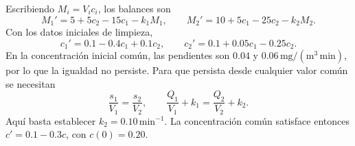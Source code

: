 Escribiendo \(M_i=V_ic_i\), los balances son
\[
M_1'=5+5c_2-15c_1-k_1M_1,\qquad
M_2'=10+5c_1-25c_2-k_2M_2.
\]
Con los datos iniciales de limpieza,
\[
c_1'=0.1-0.4c_1+0.1c_2,\qquad
c_2'=0.1+0.05c_1-0.25c_2.
\]
En la concentración inicial común, las pendientes son \(0.04\) y \(0.06\,\mathrm{mg/(m^3\,min)}\), por lo que la igualdad no persiste. Para que persista desde cualquier valor común se necesitan
\[
\frac{s_1}{V_1}=\frac{s_2}{V_2},\qquad
\frac{Q_1}{V_1}+k_1=\frac{Q_2}{V_2}+k_2.
\]
Aquí basta establecer \(k_2=0.10\,\mathrm{min}^{-1}\). La concentración común satisface entonces \(c'=0.1-0.3c\), con \(c(0)=0.20\).
